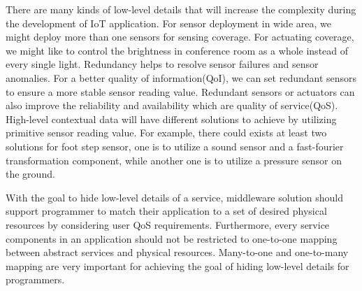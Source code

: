 There are many kinds of low-level details that will increase the complexity during the development of IoT application. For sensor deployment in wide area, we might deploy more than one sensors for sensing coverage. For actuating coverage, we might like to control the brightness in conference room as a whole instead of every single light. Redundancy helps to resolve sensor failures and sensor anomalies. For a better quality of information(QoI), we can set redundant sensors to ensure a more stable sensor reading value. Redundant sensors or actuators can also improve the reliability and availability which are quality of service(QoS). High-level contextual data will have different solutions to achieve by utilizing primitive sensor reading value. For example, there could exists at least two solutions for foot step sensor, one is to utilize a sound sensor and a fast-fourier transformation component, while another one is to utilize a pressure sensor on the ground. 


With the goal to hide low-level details of a service, middleware solution should support programmer to match their application to a set of desired physical resources by considering user QoS requirements. Furthermore, every service components in an application should not be restricted to one-to-one mapping between abstract services and physical resources. Many-to-one and one-to-many mapping are very important for achieving the goal of hiding low-level details for programmers.
